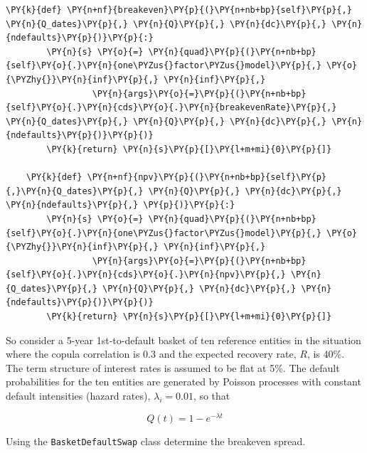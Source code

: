 \begin{tcolorbox}[breakable, size=fbox, boxrule=1pt, pad at break*=1mm,colback=cellbackground, colframe=cellborder]
\begin{Verbatim}[commandchars=\\\{\}]
    \PY{k}{def} \PY{n+nf}{breakeven}\PY{p}{(}\PY{n+nb+bp}{self}\PY{p}{,} \PY{n}{Q_dates}\PY{p}{,} \PY{n}{Q}\PY{p}{,} \PY{n}{dc}\PY{p}{,} \PY{n}{ndefaults}\PY{p}{)}\PY{p}{:}
        \PY{n}{s} \PY{o}{=} \PY{n}{quad}\PY{p}{(}\PY{n+nb+bp}{self}\PY{o}{.}\PY{n}{one\PYZus{}factor\PYZus{}model}\PY{p}{,} \PY{o}{\PYZhy{}}\PY{n}{inf}\PY{p}{,} \PY{n}{inf}\PY{p}{,} 
                 \PY{n}{args}\PY{o}{=}\PY{p}{(}\PY{n+nb+bp}{self}\PY{o}{.}\PY{n}{cds}\PY{o}{.}\PY{n}{breakevenRate}\PY{p}{,} \PY{n}{Q_dates}\PY{p}{,} \PY{n}{Q}\PY{p}{,} \PY{n}{dc}\PY{p}{,} \PY{n}{ndefaults}\PY{p}{)}\PY{p}{)}
        \PY{k}{return} \PY{n}{s}\PY{p}{[}\PY{l+m+mi}{0}\PY{p}{]}
		
    \PY{k}{def} \PY{n+nf}{npv}\PY{p}{(}\PY{n+nb+bp}{self}\PY{p}{,}\PY{n}{Q_dates}\PY{p}{,} \PY{n}{Q}\PY{p}{,} \PY{n}{dc}\PY{p}{,} \PY{n}{ndefaults}\PY{p}{,} \PY{p}{)}\PY{p}{:}
        \PY{n}{s} \PY{o}{=} \PY{n}{quad}\PY{p}{(}\PY{n+nb+bp}{self}\PY{o}{.}\PY{n}{one\PYZus{}factor\PYZus{}model}\PY{p}{,} \PY{o}{\PYZhy{}}\PY{n}{inf}\PY{p}{,} \PY{n}{inf}\PY{p}{,} 
                 \PY{n}{args}\PY{o}{=}\PY{p}{(}\PY{n+nb+bp}{self}\PY{o}{.}\PY{n}{cds}\PY{o}{.}\PY{n}{npv}\PY{p}{,} \PY{n}{Q_dates}\PY{p}{,} \PY{n}{Q}\PY{p}{,} \PY{n}{dc}\PY{p}{,} \PY{n}{ndefaults}\PY{p}{)}\PY{p}{)}
        \PY{k}{return} \PY{n}{s}\PY{p}{[}\PY{l+m+mi}{0}\PY{p}{]}        
\end{Verbatim}
\end{tcolorbox}

So consider a 5-year 1st-to-default basket of ten
reference entities in the situation where the copula correlation is 0.3
and the expected recovery rate, \(R\), is \(40\%\). The term structure
of interest rates is assumed to be flat at 5\%. The default
probabilities for the ten entities are generated by Poisson processes
with constant default intensities (hazard rates), \(\lambda_i=0.01\), so that

\[ Q(t) = 1 - e^{-\lambda t} \]

Using the \texttt{BasketDefaultSwap} class determine the breakeven spread.

